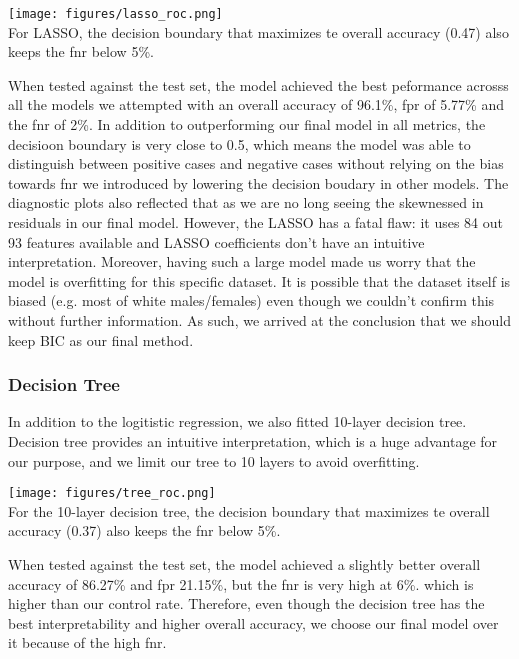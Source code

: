 \documentclass{article}
\begin{document}
\texttt{[image: figures/lasso\_roc.png]}\\

For LASSO, the decision boundary that maximizes te overall accuracy (0.47) also
keeps the fnr below 5\%.

When tested against the test set, the model achieved the best peformance acrosss
all the models we attempted with an overall accuracy of 96.1\%,  fpr of 5.77\%
and the fnr of 2\%. In addition to outperforming our final model in all metrics,
the decisioon boundary is very close to 0.5, which means the model was able to
distinguish between positive cases and negative cases without relying on the
bias towards fnr we introduced by lowering the decision boudary in other models.
The diagnostic plots also reflected that as we are no long seeing the skewnessed
in residuals in our final model. However, the LASSO has a fatal flaw: it uses
84 out 93 features available and LASSO coefficients don't have an intuitive
interpretation. Moreover, having such a large model made us worry that the model
is overfitting for this specific dataset. It is possible that the dataset itself
is biased (e.g. most of white males/females) even though we couldn't confirm
this without further information. As such, we arrived at the conclusion that we
should keep BIC as our final method.


\subsubsection{Decision Tree}
In addition to the logitistic regression, we also fitted 10-layer decision tree.
Decision tree provides an intuitive interpretation, which is a huge advantage
for our purpose, and we limit our tree to 10 layers to avoid overfitting.

\texttt{[image: figures/tree\_roc.png]}\\

For the 10-layer decision tree, the decision boundary that maximizes te overall
accuracy (0.37) also keeps the fnr below 5\%.

When tested against the test set, the model achieved a slightly better overall
accuracy of 86.27\% and fpr 21.15\%, but the fnr is very high at 6\%. which is
higher than our control rate. Therefore, even though the decision tree has the
best interpretability and higher overall accuracy, we choose our final model
over it because of the high fnr.
\end{document}

